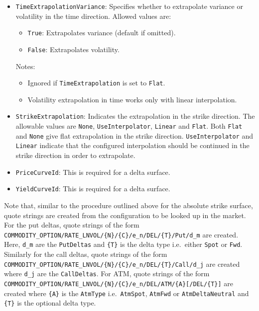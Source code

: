 \begin{itemize}
\item \lstinline!TimeExtrapolationVariance!:
Specifies whether to extrapolate variance or volatility in the time direction. Allowed values are:
  \begin{itemize}
    \item \lstinline!True!: Extrapolates variance (default if omitted).
    \item \lstinline!False!: Extrapolates volatility.
  \end{itemize}
  Notes:
  \begin{itemize}
    \item Ignored if \lstinline!TimeExtrapolation! is set to \lstinline!Flat!.
    \item Volatility extrapolation in time works only with linear interpolation.
  \end{itemize}

\item \lstinline!StrikeExtrapolation!:
Indicates the extrapolation in the strike direction. The allowable values are \lstinline!None!, \lstinline!UseInterpolator!, \lstinline!Linear! and \lstinline!Flat!. Both \lstinline!Flat! and \lstinline!None! give flat extrapolation in the strike direction. \lstinline!UseInterpolator! and \lstinline!Linear! indicate that the configured interpolation should be continued in the strike direction in order to extrapolate.

\item \lstinline!PriceCurveId!:
This is required for a delta surface.

\item \lstinline!YieldCurveId!:
This is required for a delta surface.

\end{itemize}

Note that, similar to the procedure outlined above for the absolute strike surface, quote strings are created from the configuration to be looked up in the market. For the put deltas, quote strings of the form \lstinline!COMMODITY_OPTION/RATE_LNVOL/{N}/{C}/e_n/DEL/{T}/Put/d_m! are created. Here, \lstinline!d_m! are the \lstinline!PutDeltas! and \lstinline!{T}! is the delta type i.e.\ either \lstinline!Spot! or \lstinline!Fwd!. Similarly for the call deltas, quote strings of the form \lstinline!COMMODITY_OPTION/RATE_LNVOL/{N}/{C}/e_n/DEL/{T}/Call/d_j! are created where \lstinline!d_j! are the \lstinline!CallDeltas!. For ATM, quote strings of the form \lstinline!COMMODITY_OPTION/RATE_LNVOL/{N}/{C}/e_n/DEL/ATM/{A}[/DEL/{T}]! are created where \lstinline!{A}! is the \lstinline!AtmType! i.e.\ \lstinline!AtmSpot!, \lstinline!AtmFwd! or \lstinline!AtmDeltaNeutral! and \lstinline!{T}! is the optional delta type.

